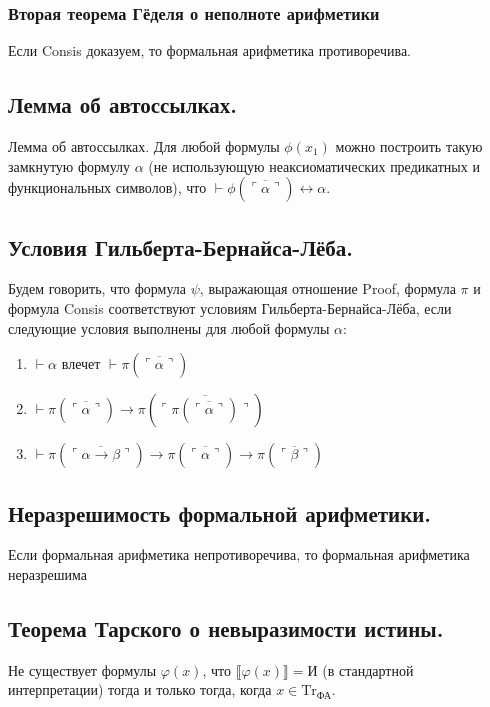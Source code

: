 \documentclass[10pt,a4paper,oneside]{article}
\begin{document}
\subsubsection{Вторая теорема Гёделя о неполноте арифметики}
 Если Consis доказуем, то формальная арифметика противоречива.

\subsection{Лемма об автоссылках.}
 Лемма об автоссылках. Для любой формулы $\phi(x_1)$ можно построить 
такую замкнутую формулу $\alpha$ (не использующую неаксиоматических предикатных
и функциональных символов), что $\vdash \phi(\overline{\ulcorner\alpha\urcorner}) \leftrightarrow \alpha$.

\subsection{Условия Гильберта-Бернайса-Лёба.}
Будем говорить, что формула $\psi$, выражающая отношение Proof, 
формула $\pi$ и формула Consis соответствуют
условиям Гильберта-Бернайса-Лёба, если следующие условия выполнены для любой формулы $\alpha$:

\begin{enumerate}
\item $\vdash \alpha$ влечет $\vdash \pi(\overline{\ulcorner\alpha\urcorner})$
\item $\vdash \pi (\overline{\ulcorner\alpha\urcorner}) \rightarrow \pi(\overline{\ulcorner\pi(\overline{\ulcorner\alpha\urcorner})\urcorner})$
\item $\vdash \pi (\overline{\ulcorner\alpha\rightarrow \beta\urcorner}) \rightarrow \pi(\overline{\ulcorner\alpha\urcorner}) \rightarrow \pi(\overline{\ulcorner\beta\urcorner})$
\end{enumerate}


\subsection{Неразрешимость формальной арифметики.}
Если формальная арифметика непротиворечива, то формальная арифметика неразрешима

\subsection{Теорема Тарского о невыразимости истины.}
Не существует формулы $\varphi(x)$, что $\llbracket \varphi(x) \rrbracket = \text{И}$ (в стандартной интерпретации) тогда и только
тогда, когда $x \in \text{Tr}_\text{ФА}$.
\end{document}
